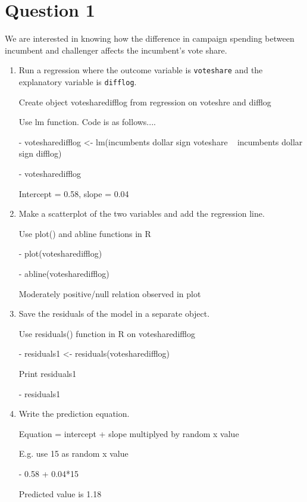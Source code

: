 \documentclass[12pt,letterpaper]{article}
\begin{document}
\section*{Question 1} %
\vspace{.25cm}
\noindent We are interested in knowing how the difference in campaign spending between incumbent and challenger affects the incumbent's vote share. 
	\begin{enumerate}
		\item Run a regression where the outcome variable is \texttt{voteshare} and the explanatory variable is \texttt{difflog}.	\vspace{5cm}
		
		Create object votesharedifflog from regression on voteshre and difflog
		
		Use lm function. Code is as follows....
		
	- votesharedifflog <- lm(incumbents dollar sign voteshare ~ incumbents dollar sign difflog)
	
	- votesharedifflog 
	
	Intercept = 0.58, slope = 0.04
		
	
	
		\item Make a scatterplot of the two variables and add the regression line. 	\vspace{7cm}
	
		Use plot() and abline functions in R
		
		- plot(votesharedifflog)
		
		- abline(votesharedifflog)
		
	Moderately positive/null relation observed in plot
		
		\item Save the residuals of the model in a separate object.	\vspace{7cm}
		
		Use residuals() function in R on votesharedifflog
		
	- 	residuals1 <- residuals(votesharedifflog) 
	
	Print residuals1
	
	- 	residuals1
		\item Write the prediction equation.
		
		Equation = intercept + slope multiplyed by random x value
		
		E.g. use 15 as random x value
		
	- 	0.58 + 0.04*15
		
		Predicted value is 1.18
	\end{enumerate}
	
\end{document}
